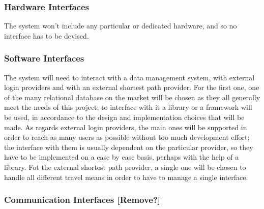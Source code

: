 \subsubsection{Hardware Interfaces}

The system won't include any particular or dedicated hardware, and so no interface has to be devised.

\subsubsection{Software Interfaces}

The system will need to interact with a data management system, with external login providers and with an external shortest path provider.
For the first one, one of the many relational database on the market will be chosen as they all generally meet the needs of this project; to interface with it a library or a framework will be used, in accordance to the design and implementation choices that will be made.
As regards external login providers, the main ones will be supported in order to reach as many users as possible without too much development effort; the interface with them is usually dependent on the particular provider, so they have to be implemented on a case by case basis, perhaps with the help of a library.
Fot the external shortest path provider, a single one will be chosen to handle all different travel means in order to have to manage a single interface.

\subsubsection{Communication Interfaces [Remove?]}